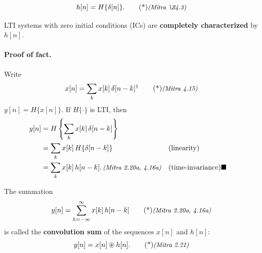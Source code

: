 \documentclass[handout_subfiles_root.tex]{subfiles}
\begin{document}
\maketitle


\begin{equation}
h[n] = H\{\delta[n]\}.\MitraTag{\S4.3}
\end{equation}

\begin{factbox}
LTI systems with zero initial conditions (ICs) are \textbf{completely
characterized} by $h[n]$.
\end{factbox}

\paragraph{Proof of fact.} Write
\begin{equation}
x[n] = \sum_k x[k]\,\delta[n-k]\footnotemark{}\MitraTag{4.15}
\end{equation}
\qquad $y[n] = H\{x[n]\}.$
If $H\{\cdot\}$ is LTI, then
\begin{align*}
  y[n] &= H\left\{\sum_k x[k]\,\delta[n-k]\right\} \\
  &= \sum_k x[k]\,H\{\delta[n-k]\} && \text{(linearity)} \\
  &= \sum_k x[k]\,h[n-k].\,{\small\textit{(Mitra~2.20a,\ 4.16a)}} && \text{(time-invariance)} \blacksquare
\end{align*}

\noindent The summation
\begin{equation}
y[n] = \sum_{k=-\infty}^{\infty} x[k]\,h[n-k]\MitraTag{2.20a,\ 4.16a}
\end{equation}
is called the \textbf{convolution sum} of the sequences $x[n]$ and $h[n]$:
\begin{equation}
y[n] = x[n] \circledast h[n].\MitraTag{2.21}
\end{equation}
\end{document}

